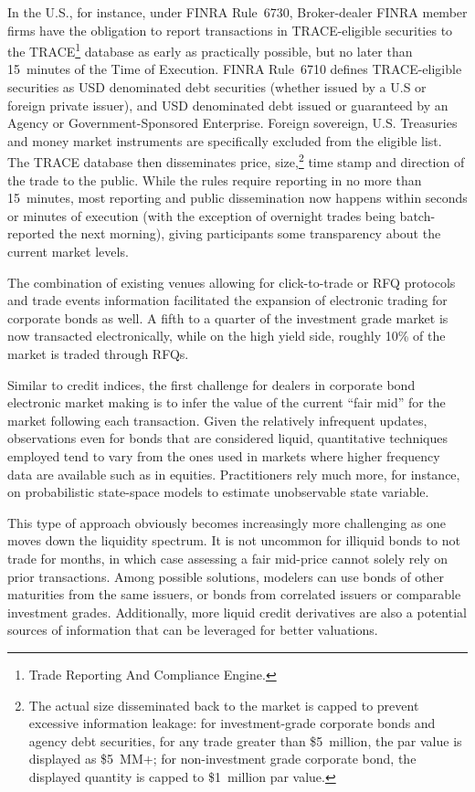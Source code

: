 In the U.S., for instance, under FINRA Rule~6730, Broker-dealer FINRA member firms have the obligation to report transactions in TRACE-eligible securities to the TRACE\footnote{Trade Reporting And Compliance Engine.} database as early as practically possible, but no later than 15~minutes of the Time of Execution. FINRA Rule~6710 defines TRACE-eligible securities as USD denominated debt securities (whether issued by a U.S or foreign private issuer), and USD denominated debt issued or guaranteed by an Agency or Government-Sponsored Enterprise. Foreign sovereign, U.S. Treasuries and money market instruments are specifically excluded from the eligible list. The TRACE database then disseminates price, size,\footnote{The actual size disseminated back to the market is capped to prevent excessive information leakage: for investment-grade corporate bonds and agency debt securities, for any trade greater than \$5~million, the par value is displayed as \$5~MM$+$; for non-investment grade corporate bond, the displayed quantity is capped to \$1~million par value.} time stamp and direction of the trade to the public. While the rules require reporting in no more than 15~minutes, most reporting and public dissemination now happens within seconds or minutes of execution (with the exception of overnight trades being batch-reported the next morning), giving participants some transparency about the current market levels.


The combination of existing venues allowing for click-to-trade or RFQ protocols and trade events information facilitated the expansion of electronic trading for corporate bonds as well. A fifth to a quarter of the investment grade market is now transacted electronically, while on the high yield side, roughly 10\% of the market is traded through RFQs.


Similar to credit indices, the first challenge for dealers in corporate bond electronic market making is to infer the value of the current ``fair mid'' for the market following each transaction. Given the relatively infrequent updates, observations even for bonds that are considered liquid, quantitative techniques employed tend to vary from the ones used in markets where higher frequency data are available such as in equities. Practitioners rely much more, for instance, on probabilistic state-space models to estimate unobservable state variable.


This type of approach obviously becomes increasingly more challenging as one moves down the liquidity spectrum. It is not uncommon for illiquid bonds to not trade for months, in which case assessing a fair mid-price cannot solely rely on prior transactions. Among possible solutions, modelers can use bonds of other maturities from the same issuers, or bonds from correlated issuers or comparable investment grades. Additionally, more liquid credit derivatives are also a potential sources of information that can be leveraged for better valuations. 


